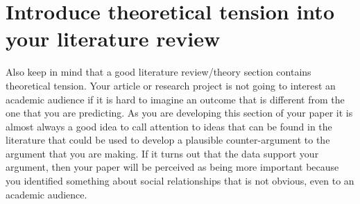 \documentclass[12pt]{article}
\begin{document}
\section{{\textbf{Introduce theoretical tension into your literature review}}}
\begin{singlespace}
Also keep in mind that a good literature review/theory section contains theoretical tension. Your article or research project is not going to interest an academic audience if it is hard to imagine an outcome that is different from the one that you are predicting. As you are developing this section of your paper it is almost always a good idea to call attention to ideas that can be found in the literature that could be used to develop a plausible counter-argument to the argument that you are making. If it turns out that the data support your argument, then your paper will be perceived as being more important because you identified something about social relationships that is not obvious, even to an academic audience. 
\end{singlespace}
\end{document}
